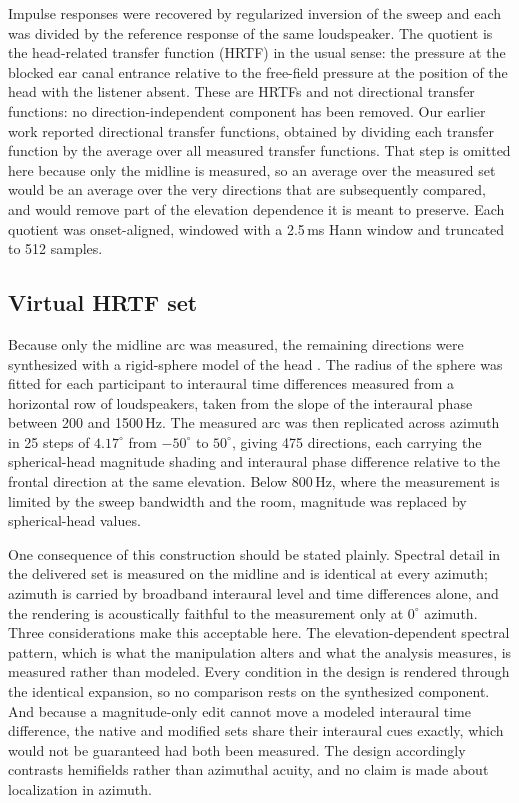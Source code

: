 Impulse responses were recovered by regularized inversion of the sweep and
each was divided by the reference response of the same loudspeaker. The
quotient is the head-related transfer function (HRTF) in the usual sense: the
pressure at the blocked ear canal entrance relative to the free-field pressure
at the position of the head with the listener absent. These are HRTFs and not
directional transfer functions: no direction-independent component has been
removed. Our earlier work
reported directional transfer functions, obtained by dividing each transfer
function by the average over all measured transfer functions. That step is
omitted here because only the midline is measured, so an average over the
measured set would be an average over the very directions that are
subsequently compared, and would remove part of the elevation dependence it is
meant to preserve. Each quotient was onset-aligned, windowed with a 2.5\,ms
Hann window and truncated to 512 samples.

\subsection{Virtual HRTF set}

Because only the midline arc was measured, the remaining directions were
synthesized with a rigid-sphere model of the head
. The radius of the sphere was fitted for each participant to interaural time
differences measured from a horizontal row of loudspeakers, taken from the
slope of the interaural phase between 200 and 1500\,Hz. The measured arc was then replicated
across azimuth in 25 steps of $4.17^\circ$ from $-50^\circ$ to $50^\circ$,
giving 475 directions, each carrying the spherical-head magnitude shading and
interaural phase difference relative to the frontal direction at the same
elevation. Below 800\,Hz, where the measurement is limited by the sweep
bandwidth and the room, magnitude was replaced by spherical-head values.

One consequence of this construction should be stated plainly. Spectral detail
in the delivered set is measured on the midline and is identical at every
azimuth; azimuth is carried by broadband interaural level and time differences
alone, and the rendering is acoustically faithful to the measurement only at
$0^\circ$ azimuth. Three considerations make this acceptable here. The
elevation-dependent spectral pattern, which is what the manipulation alters
and what the analysis measures, is measured rather than modeled. Every
condition in the design is rendered through the identical expansion, so no
comparison rests on the synthesized component. And because a magnitude-only
edit cannot move a modeled interaural time difference, the native and modified
sets share their interaural cues exactly, which would not be guaranteed had
both been measured. The design accordingly contrasts hemifields rather than
azimuthal acuity, and no claim is made about localization in azimuth.

